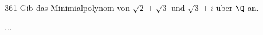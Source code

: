 \begin{algebraUE}{361}
Gib das Minimialpolynom von $\sqrt{2} + \sqrt{3}$ und $\sqrt{3} + i$ über $\Q$ an.
\end{algebraUE}

\begin{solution}
...
\end{solution}
